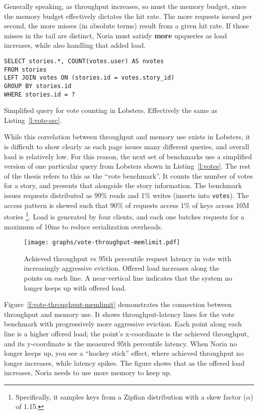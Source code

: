 Generally speaking, as throughput increases, so must the memory budget, since
the memory budget effectively dictates the hit rate. The more requests issued
per second, the more misses (in absolute terms) result from a given hit rate. If
those misses in the tail are distinct, Noria must satisfy \textbf{more}
upqueries as load increases, while also handling that added load.

\begin{listing}[h]
  \begin{verbatim}
SELECT stories.*, COUNT(votes.user) AS nvotes
FROM stories
LEFT JOIN votes ON (stories.id = votes.story_id)
GROUP BY stories.id
WHERE stories.id = ?
  \end{verbatim}
  \caption{Simplified query for vote counting in Lobsters. Effectively the same
  as Listing~\vref{l:vote-src}.}
  \label{l:votes}
\end{listing}

While this correlation between throughput and memory use exists in Lobsters, it
is difficult to show clearly as each page issues many different queries, and
overall load is relatively low. For this reason, the next set of benchmarks use
a simplified version of one particular query from Lobsters shown in
Listing~\vref{l:votes}. The rest of the thesis refers to this as the ``vote
benchmark''. It counts the number of votes for a story, and presents that
alongside the story information. The benchmark issues requests distributed as
99\% reads and 1\% writes (inserts into \texttt{votes}). The access pattern is
skewed such that 90\% of requests access 1\% of keys across 10M stories%
\footnote{Specifically, it samples keys from a Zipfian distribution with a skew
factor ($\alpha$) of 1.15.}. Load is generated by four clients, and each one
batches requests for a maximum of 10ms to reduce serialization overheads.

\begin{figure}[h]
  \centering
  \texttt{[image: graphs/vote-throughput-memlimit.pdf]}
  \caption{Achieved throughput vs 95th percentile request latency in vote with
  increasingly aggressive eviction. Offered load increases along the points on
  each line. A near-vertical line indicates that the system no longer keeps up
  with offered load.}
  \label{f:vote-throughput-memlimit}
\end{figure}

Figure~\vref{f:vote-throughput-memlimit} demonstrates the connection between
throughput and memory use. It shows throughput-latency lines for the vote
benchmark with progressively more aggressive eviction. Each point along each
line is a higher offered load; the point's x-coordinate is the achieved
throughput, and its y-coordinate is the measured 95th percentile latency. When
Noria no longer keeps up, you see a ``hockey stick'' effect, where achieved
throughput no longer increases, while latency spikes. The figure shows that as
the offered load increases, Noria needs to use more memory to keep up.

